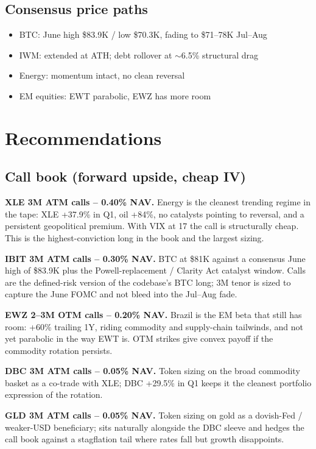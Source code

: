 \documentclass[11pt,letterpaper]{article}
\begin{document}
\subsection{Consensus price paths}
\begin{itemize}[nosep]
  \item BTC: June high \$83.9K / low \$70.3K, fading to \$71--78K Jul--Aug
  \item IWM: extended at ATH; debt rollover at $\sim$6.5\% structural drag
  \item Energy: momentum intact, no clean reversal
  \item EM equities: EWT parabolic, EWZ has more room
\end{itemize}

\section{Recommendations}

\subsection{Call book (forward upside, cheap IV)}

\textbf{XLE 3M ATM calls -- 0.40\% NAV.} Energy is the cleanest
trending regime in the tape: XLE +37.9\% in Q1, oil +84\%, no
catalysts pointing to reversal, and a persistent geopolitical
premium. With VIX at 17 the call is structurally cheap. This is
the highest-conviction long in the book and the largest sizing.

\textbf{IBIT 3M ATM calls -- 0.30\% NAV.} BTC at \$81K against a
consensus June high of \$83.9K plus the Powell-replacement /
Clarity Act catalyst window. Calls are the defined-risk version
of the codebase's BTC long; 3M tenor is sized to capture the June
FOMC and not bleed into the Jul--Aug fade.

\textbf{EWZ 2--3M OTM calls -- 0.20\% NAV.} Brazil is the EM beta
that still has room: +60\% trailing 1Y, riding commodity and
supply-chain tailwinds, and not yet parabolic in the way EWT is.
OTM strikes give convex payoff if the commodity rotation persists.

\textbf{DBC 3M ATM calls -- 0.05\% NAV.} Token sizing on the broad
commodity basket as a co-trade with XLE; DBC +29.5\% in Q1 keeps
it the cleanest portfolio expression of the rotation.

\textbf{GLD 3M ATM calls -- 0.05\% NAV.} Token sizing on gold as a
dovish-Fed / weaker-USD beneficiary; sits naturally alongside the
DBC sleeve and hedges the call book against a stagflation tail
where rates fall but growth disappoints.
\end{document}
